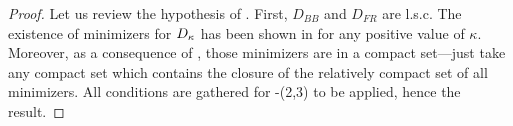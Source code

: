 \begin{proof}
Let us review the hypothesis of  .
First, $D_{BB}$ and $D_{FR}$ are l.s.c. The existence of minimizers for $D_{\kappa}$ has been shown in  for any positive value of $\kappa$. Moreover, as a consequence of , those minimizers are in a compact set---just take any compact set which contains the closure of the relatively compact set of all minimizers. All conditions are gathered for -(2,3) to be applied, hence the result.
\end{proof}




